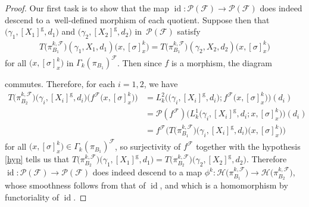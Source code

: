 \documentclass[10pt,a4paper]{amsart}
\numberwithin{equation}{section}
\def\g{\operatorname{g}}
\def\id{\operatorname{id}}
\def\FF{{\mathcal{F}}}
\def\HH{{\mathcal{H}}}
\def\PP{{\mathcal{P}}}
\begin{document}
\begin{proof}
Our first task is to show that the map $\id\colon \PP(\FF)\rightarrow\PP(\FF)$ does indeed descend to a~well-defined morphism of each quotient. Suppose then that $\big(\gamma_{1},[X_{1}]^{\g},d_{1}\big)$ and $\big(\gamma_{2},[X_{2}]^{\g},d_{2}\big)$ in~$\PP(\FF)$ satisfy
\begin{gather}\label{hyp}
T\big(\pi_{B_{1}}^{k,\FF}\big)(\gamma_{1},X_{1},d_{1})\big(x,[\sigma]^{k}_{x}\big) =T\big(\pi_{B_{1}}^{k,\FF}\big)(\gamma_{2},X_{2},d_{2})\big(x,[\sigma]^{k}_{x}\big)
\end{gather}
for all $\big(x,[\sigma]_{x}^{k}\big)$ in $\Gamma_{k}(\pi_{B_{1}})^{\FF}$. Then since $f$ is a morphism, the diagram
\begin{center}
\end{center}
commutes. Therefore, for each $i = 1,2$, we have
\begin{align*}
T\big(\pi_{B_{2}}^{k,\FF}\big)\big(\gamma_{i},[X_{i}]^{\g},d_{i}\big)\big(f^{\FF}\big(x,[\sigma]^{k}_{x}\big)\big)
&= L_{k}^{2}\big(\big(\gamma_{i},[X_{i}]^{\g},d_{i}\big);f^{\FF}\big(x,[\sigma]^{k}_{x}\big)\big)(d_{i})
\\
&= \PP(f^{\FF})\big(L_{k}^{1}\big(\gamma_{i},[X_{i}]^{\g},d_{i};x,[\sigma]^{k}_{x}\big)\big)(d_{i})
\\
&= f^{\FF}\big(T\big(\pi_{B_{1}}^{k,\FF}\big)\big(\gamma_{i},[X_{i}]^{\g},d_{i}\big)\big(x,[\sigma]_{x}^{k}\big)\big)
\end{align*}
for all $\big(x,[\sigma]_{x}^{k}\big)\in\Gamma_{k}(\pi_{B_{1}})^{\FF}$, so surjectivity of $f^{\FF}$ together with the hypothesis \eqref{hyp} tells us that $T\big(\pi_{B_{2}}^{k,\FF}\big)\big(\gamma_{1},[X_{1}]^{\g},d_{1}\big) = T\big(\pi_{B_{2}}^{k,\FF}\big)\big(\gamma_{2},[X_{2}]^{\g},d_{2}\big)$. Therefore $\id\colon \PP(\FF)\rightarrow\PP(\FF)$ does indeed descend to a map $\phi^{k}\colon \HH\big(\pi_{B_{1}}^{k,\FF}\big)\rightarrow\HH\big(\pi_{B_{2}}^{k,\FF}\big)$, whose smoothness follows from that of $\id$, and which is a homomorphism by functoriality of $\id$.


\end{proof}
\end{document}
